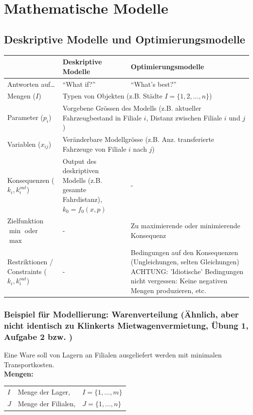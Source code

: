 \section{Mathematische Modelle }
\subsection{Deskriptive Modelle und Optimierungsmodelle }
  \begin{tabular}{|p{3.7cm}|p{7cm}|p{7cm}|}
    \hline
    & \textbf{Deskriptive Modelle}
    & \textbf{Optimierungsmodelle} \\
    \hline
    \hline
    Antworten auf\ldots
      & ``What if?''
      & ``What's best?'' \\
    \hline
    Mengen ($I$)
      & \multicolumn{2}{l|}{Typen von Objekten (z.B. Städte $I = \{1,2,\ldots,n\}$)} \\
    \hline
    Parameter ($p_i$)
      & \multicolumn{2}{p{14cm}|}{Vorgebene Grössen des Modells (z.B. aktueller Fahrzeugbestand in Filiale $i$, Distanz zwischen Filiale $i$ und $j$)} \\
    \hline
    Variablen ($x_{ij}$)
      & \multicolumn{2}{l|}{Veränderbare Modellgrösse (z.B. Anz. transferierte Fahrzeuge von Filiale $i$ nach $j$)} \\
    \hline
    Konsequenzen ($k_{i}, k_i^{out}$)
      & Output des deskriptiven Modells (z.B. gesamte Fahrdistanz), $k_0 = f_0(x,p)$ 
      & -\\
    \hline
    Zielfunktion $\min$ oder $\max$
      & - 
      & Zu maximierende oder minimierende Konsequenz\\
    \hline
    Restriktionen / Constraints ($k_{i}, k_i^{out}$)
      & - 
      & Bedingungen auf den Konsequenzen (Ungleichungen, selten Gleichungen) ACHTUNG: 'Idiotische' Bedingungen nicht vergessen: Keine negativen Mengen produzieren, etc.\\
    \hline
  \end{tabular}
  
  \subsubsection{Beispiel für Modellierung: Warenverteilung (Ähnlich, aber nicht identisch zu Klinkerts Mietwagenvermietung, Übung 1, Aufgabe 2 bzw. )}
  Eine Ware soll von Lagern an Filialen ausgeliefert werden mit minimalen Transportkosten.\\
  
  \textbf{Mengen:}\\
  \begin{tabular}{lll}
    $I$ & Menge der Lager, &$I = \{1, \ldots, m\}$\\
    $J$ & Menge der Filialen, &$J = \{1, \ldots, n\}$
  \end{tabular}\\
  
